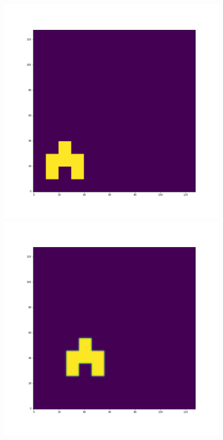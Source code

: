 \documentclass[12pt,a4paper]{article}
\begin{document}
\begin{figure}[H]
\centering
\begin{minipage}{.3\textwidth}
  \centering
  \includegraphics[width=\linewidth]{Pictures/Solve2DWhiteBearMovementTestTHINC/Solve2DWhiteBearMovementTest_t0.png}
\end{minipage}%
\begin{minipage}{.3\textwidth}
  \centering
  \includegraphics[width=\linewidth]{Pictures/Solve2DWhiteBearMovementTestTHINC/Solve2DWhiteBearMovementTest_t10.png}

\end{minipage}
\end{figure}
\end{document}
